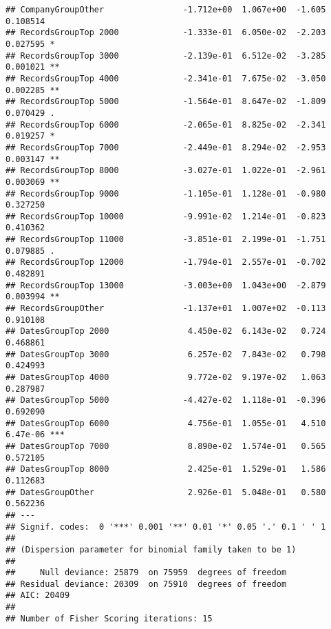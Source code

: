 \documentclass[
]{article}
\newenvironment{Shaded}{\begin{snugshade}}{\end{snugshade}}
\newcommand{\AttributeTok}[1]{\textcolor[rgb]{0.13,0.29,0.53}{#1}}
\newcommand{\FunctionTok}[1]{\textcolor[rgb]{0.13,0.29,0.53}{\textbf{#1}}}
\newcommand{\NormalTok}[1]{#1}
\newcommand{\OtherTok}[1]{\textcolor[rgb]{0.56,0.35,0.01}{#1}}
\newcommand{\SpecialCharTok}[1]{\textcolor[rgb]{0.81,0.36,0.00}{\textbf{#1}}}
\newcommand{\StringTok}[1]{\textcolor[rgb]{0.31,0.60,0.02}{#1}}
\begin{document}
\begin{verbatim}
## CompanyGroupOther                -1.712e+00  1.067e+00  -1.605 0.108514    
## RecordsGroupTop 2000             -1.333e-01  6.050e-02  -2.203 0.027595 *  
## RecordsGroupTop 3000             -2.139e-01  6.512e-02  -3.285 0.001021 ** 
## RecordsGroupTop 4000             -2.341e-01  7.675e-02  -3.050 0.002285 ** 
## RecordsGroupTop 5000             -1.564e-01  8.647e-02  -1.809 0.070429 .  
## RecordsGroupTop 6000             -2.065e-01  8.825e-02  -2.341 0.019257 *  
## RecordsGroupTop 7000             -2.449e-01  8.294e-02  -2.953 0.003147 ** 
## RecordsGroupTop 8000             -3.027e-01  1.022e-01  -2.961 0.003069 ** 
## RecordsGroupTop 9000             -1.105e-01  1.128e-01  -0.980 0.327250    
## RecordsGroupTop 10000            -9.991e-02  1.214e-01  -0.823 0.410362    
## RecordsGroupTop 11000            -3.851e-01  2.199e-01  -1.751 0.079885 .  
## RecordsGroupTop 12000            -1.794e-01  2.557e-01  -0.702 0.482891    
## RecordsGroupTop 13000            -3.003e+00  1.043e+00  -2.879 0.003994 ** 
## RecordsGroupOther                -1.137e+01  1.007e+02  -0.113 0.910108    
## DatesGroupTop 2000                4.450e-02  6.143e-02   0.724 0.468861    
## DatesGroupTop 3000                6.257e-02  7.843e-02   0.798 0.424993    
## DatesGroupTop 4000                9.772e-02  9.197e-02   1.063 0.287987    
## DatesGroupTop 5000               -4.427e-02  1.118e-01  -0.396 0.692090    
## DatesGroupTop 6000                4.756e-01  1.055e-01   4.510 6.47e-06 ***
## DatesGroupTop 7000                8.890e-02  1.574e-01   0.565 0.572105    
## DatesGroupTop 8000                2.425e-01  1.529e-01   1.586 0.112683    
## DatesGroupOther                   2.926e-01  5.048e-01   0.580 0.562236    
## ---
## Signif. codes:  0 '***' 0.001 '**' 0.01 '*' 0.05 '.' 0.1 ' ' 1
## 
## (Dispersion parameter for binomial family taken to be 1)
## 
##     Null deviance: 25879  on 75959  degrees of freedom
## Residual deviance: 20309  on 75910  degrees of freedom
## AIC: 20409
## 
## Number of Fisher Scoring iterations: 15
\end{verbatim}

\begin{Shaded}
\end{Shaded}
\end{document}
